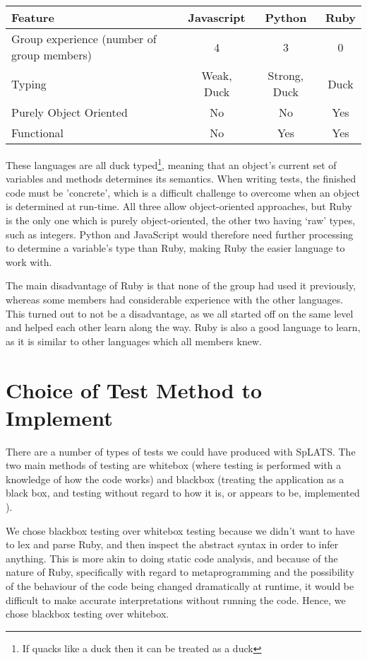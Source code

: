   \begin{tabular}{| l | c | c | c |}
  \hline
  \textbf{Feature} & \textbf{Javascript} & \textbf{Python} & \textbf{Ruby} \\
  \hline
  Group experience (number of group members) & 4 & 3 & 0 \\
  \hline
  Typing & Weak, Duck & Strong, Duck & Duck \\
  \hline
  Purely Object Oriented & No & No & Yes \\
  \hline
  Functional & No & Yes & Yes \\
  \hline
  \end{tabular}
  
These languages are all duck typed\footnote{If quacks like a duck then it can be treated as a duck}, meaning that an object's current set of variables and methods determines its semantics. When writing tests, the finished code must be 'concrete', which is a difficult challenge to overcome when an object is determined at run-time.
All three allow object-oriented approaches, but Ruby is the only one which is purely object-oriented, the other two having `raw' types, such as integers. Python and JavaScript would therefore need further processing to determine a variable's type than Ruby, making Ruby the easier language to work with.

The main disadvantage of Ruby is that none of the group had used it previously, whereas some members had considerable experience with the other languages. This turned out to not be a disadvantage, as we all started off on the same level and helped each other learn along the way. Ruby is also a good language to learn, as it is similar to other languages which all members knew.

\section{Choice of Test Method to Implement}
  There are a number of types of tests we could have produced with SpLATS.
  The two main methods of testing are whitebox (where testing is performed
  with a knowledge of how the code works) and blackbox (treating the
  application as a black box, and testing without regard to how it is, or
  appears to be, implemented ).

  We chose blackbox testing over whitebox testing because we didn't want to
  have to lex and parse Ruby, and then inspect the abstract syntax in order
  to infer anything. This is more akin to doing static code analysis, and
  because of the nature of Ruby, specifically with regard to metaprogramming
  and the possibility of the behaviour of the code being changed dramatically
  at runtime, it would be difficult to make accurate interpretations without
  running the code. Hence, we chose blackbox testing over whitebox.
